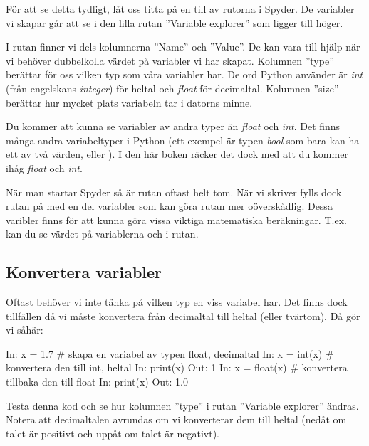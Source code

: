 För att se detta tydligt, låt oss titta på en till av rutorna i Spyder. De variabler vi skapar går att se i den lilla rutan ''Variable explorer'' som ligger till höger.


I rutan finner vi dels kolumnerna ''Name'' och ''Value''. De kan vara till hjälp när vi behöver dubbelkolla värdet på variabler vi har skapat. Kolumnen ''type'' berättar för oss vilken typ som våra variabler har. De ord Python använder är \emph{int} (från engelskans \emph{integer}) för heltal och \emph{float} för decimaltal. Kolumnen ''size'' berättar hur mycket plats variabeln tar i datorns minne.

Du kommer att kunna se variabler av andra typer än \emph{float} och \emph{int}. Det finns många andra variabeltyper i Python (ett exempel är typen \emph{bool} som bara kan ha ett av två värden,  eller ). I den här boken räcker det dock med att du kommer ihåg \emph{float} och \emph{int}.

När man startar Spyder så är rutan oftast helt tom. När vi skriver  fylls dock rutan på med en del variabler som kan göra rutan mer oöverskådlig. Dessa varibler finns för att kunna göra vissa viktiga matematiska beräkningar. T.ex. kan du se värdet på variablerna  och  i rutan.

\subsection{Konvertera variabler}\label{subsec:konverteraVariabler}
Oftast behöver vi inte tänka på vilken typ en viss variabel har. Det finns dock tillfällen då vi måste konvertera från decimaltal till heltal (eller tvärtom). Då gör vi såhär:

\begin{python}[caption={Konvertera variabler},label={}]
In: x = 1.7 # skapa en variabel av typen float, decimaltal
In: x = int(x) # konvertera den till int, heltal
In: print(x)
Out: 1
In: x = float(x) # konvertera tillbaka den till float
In: print(x)
Out: 1.0
\end{python}

Testa denna kod och se hur kolumnen ''type'' i rutan ''Variable explorer'' ändras. Notera att decimaltalen avrundas om vi konverterar dem till heltal (nedåt om talet är positivt och uppåt om talet är negativt).

